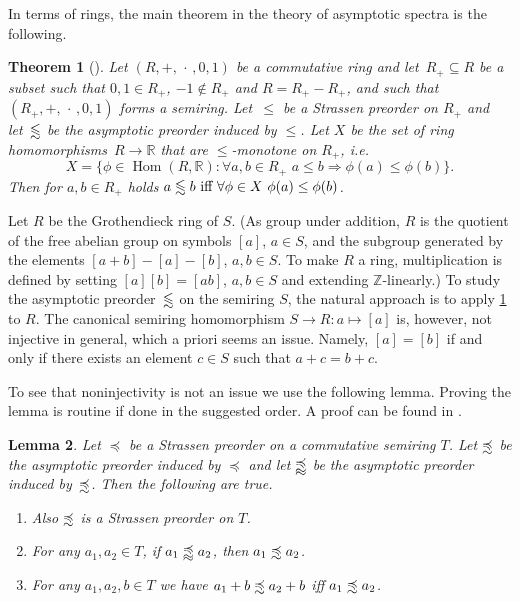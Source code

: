 \documentclass[a4paper, fleqn]{amsart}
\theoremstyle{plain}
\newtheorem{theorem}{Theorem}[section]
\newtheorem{lemma}[theorem]{Lemma}
\theoremstyle{definition}
\newcommand{\ZZ}{\mathbb{Z}}
\newcommand{\RR}{\mathbb{R}}
\DeclareMathOperator{\Hom}{Hom}
\newcommand{\jeroen}[1]{#1}
\let\leqx\leqslant
\newcommand{\asympleqx}{%
  \mathrel{%
    \vphantom{\leqslant}%
    \smash{\vcenter{\doasympleqx}}%
  }%
}
\newcommand{\doasympleqx}{%
  \hbox{\ooalign{%
    \noalign{\kern.25ex}
    $\leqslant$\cr
    \noalign{\kern1.25ex}
    \smash{$\sim$}\cr
  }}%
}
\newcommand{\asympdomleq}{%
  \mathrel{%
    \vphantom{\preccurlyeq}%
    \smash{\vcenter{\doasympdomleq}}%
  }%
}
\newcommand{\doasympdomleq}{%
  \hbox{\ooalign{%
    \noalign{\kern.25ex}
    $\preccurlyeq$\cr
    \noalign{\kern1.25ex}
    \smash{$\sim$}\cr
  }}%
}
\newcommand{\asympasympdomleq}{%
  \mathrel{%
    \vphantom{\preccurlyeq}%
    \smash{\vcenter{\doasympasympdomleq}}%
  }%
}
\newcommand{\doasympasympdomleq}{%
  \hbox{\ooalign{%
    \noalign{\kern.25ex}
    $\preccurlyeq$\cr
    \noalign{\kern1.25ex}
    \smash{$\sim$}\cr
    \noalign{\kern0.5ex}
    \smash{$\sim$}\cr
  }}%
}
\newcommand{\domleq}{\preccurlyeq}
\let\leqx\leqslant
\begin{document}
\jeroen{
In terms of rings, the main theorem in the theory of asymptotic spectra is the following.

%
%
%
%
%
%
%

%
%
%
%
%
%
%

\begin{theorem}[{\cite[Cor.~2.6]{strassen1988asymptotic}}]\label{src}
Let $(R, +, \,\cdot\,, 0, 1)$ be a commutative ring and let~$R_+\subseteq R$ be a subset such that $0,1 \in R_+$, %
$-1\not\in R_+$ and $R = R_+ - R_+$, and such that~$(R_+, +,\,\cdot\,, 0,1)$ forms a semiring. %
Let~${\leqx}$ be a Strassen preorder on $R_+$ and let~${\asympleqx}$ be the asymptotic preorder induced by ${\leqx}$.
Let $X$ be the set of ring homomorphisms~$R \to \RR$ that are $\leqx$-monotone on $R_+$, i.e.\
\[
X = \{ \phi \in \Hom(R, \RR) : \forall a, b \in R_+\,\, a \leqx b \Rightarrow \phi(a) \leq \phi(b)\}.
\]
Then for $a,b \in R_+$ holds $a \asympleqx b \textnormal{ iff } \forall \phi \in X\,\, \phi(a) \leq \phi(b)$.
\end{theorem}

Let $R$ be the Grothendieck ring of $S$. (As group under addition, $R$ is the quotient of the free abelian group on symbols $[a]$, $a \in S$, and the subgroup generated by the elements $[a+b] - [a] - [b]$, $a,b \in S$. To make $R$ a ring, multiplication is defined by setting $[a][b] = [ab]$, $a,b \in S$ and extending $\ZZ$-linearly.)
To study the asymptotic preorder~$\asympleqx$ on the semiring $S$, the natural approach is to apply \cref{src} to $R$. The canonical semiring homomorphism $S \to R : a \mapsto [a]$ is, however, not injective in general, which a priori seems an issue. Namely, $[a] = [b]$ if and only if there exists an element $c \in S$ such that $a+c = b+c$.

To see that noninjectivity is not an issue we use the following lemma. %
Proving the lemma is routine if done in the suggested order. A proof can be found in %
\cite[Chapter~2]{phd}.
\begin{lemma}\label{biglem}
Let $\domleq$ be a Strassen preorder on a commutative semiring $T$.
Let $\asympdomleq$ be the asymptotic preorder induced by $\domleq$ and let $\asympasympdomleq$ be the asymptotic preorder induced by~$\asympdomleq$. 
 Then the following are true.
\begin{enumerate}[label=\upshape(\roman*)]
\item Also $\asympdomleq$ is a Strassen preorder on $T$. \label{23}
\item For any $a_1, a_2 \in T$, if $a_1 \asympasympdomleq a_2$, then $a_1 \asympdomleq a_2$.\label{asympasymp}
\item For any $a_1, a_2, b \in T$ we have $a_1 + b \asympdomleq a_2 + b$ iff $a_1\asympdomleq a_2$. \label{add_reg}
\end{enumerate}
%
\end{lemma}

}
\end{document}
